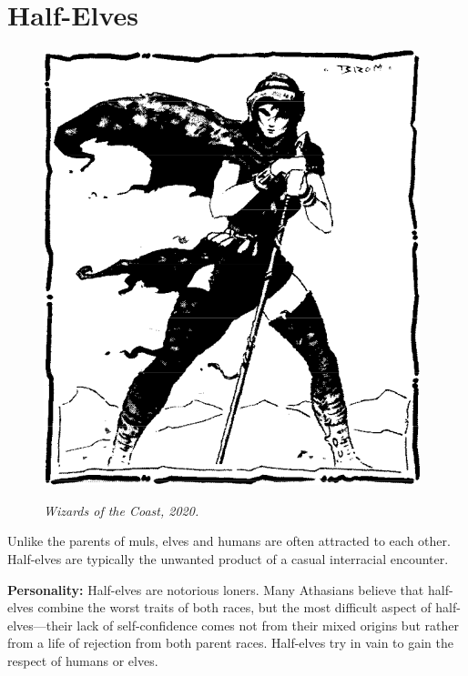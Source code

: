 \vskip2cm
\section{Half-Elves}

\begin{figure}[b!]
\centering
\includegraphics[width=\columnwidth]{images/halfelf-1.png}
\par\textit{\small\textcopyright Wizards of the Coast, 2020.}
\end{figure}
Unlike the parents of muls, elves and humans are often attracted to each other. Half-elves are typically the unwanted product of a casual interracial encounter.

\textbf{Personality:} Half-elves are notorious loners. Many Athasians believe that half-elves combine the worst traits of both races, but the most difficult aspect of half-elves---their lack of self-confidence comes not from their mixed origins but rather from a life of rejection from both parent races. Half-elves try in vain to gain the respect of humans or elves.

